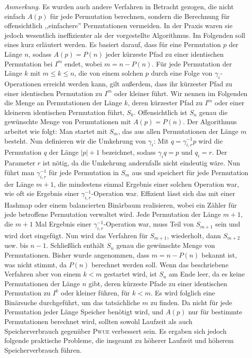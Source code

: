 \documentclass[a4paper, 11pt, ngerman]{article}
\begin{document}
\noindent \emph{Anmerkung.} Es wurden auch andere Verfahren in Betracht gezogen, die nicht einfach $A(p)$ für jede Permutation berechnen, sondern die Berechnung für offensichtlich ,,einfachere'' Permutationen vermeiden. In der Praxis waren sie jedoch wesentlich ineffizienter als der vorgestellte Algorithmus. Im Folgenden soll eines kurz erläutert werden. Es basiert darauf, dass für eine Permutation $p$ der Länge $n$, sodass $A(p) = P(n)$ jeder kürzeste Pfad zu einer identischen Permutation bei $I^{m}$ endet, wobei $m = n - P(n)$. Für jede Permutation der Länge $k$ mit $m \le k \le n$, die von einem solchen $p$ durch eine Folge von $\gamma_i$-Operationen erreicht werden kann, gilt außerdem, dass ihr kürzester Pfad zu einer identischen Permutation zu $I^m$ oder kleiner führt. Wir nennen im Folgenden die Menge an Permutationen der Länge $k$, deren kürzester Pfad zu $I^m$ oder einer kleineren identischen Permutation führt, $S_k$. Offensichtlich ist $S_n$ genau die gewünschte Menge von Permutationen mit $A(p) = P(n)$. Der Algorithmus arbeitet wie folgt: Man startet mit $S_m$, das aus allen Permutationen der Länge $m$ besteht. Nun definieren wir die Umkehrung von $\gamma_i$: Mit $q = \gamma_{i, r}^{-1} p$ wird die Permutation $q$ der Länge $|p| + 1$ bezeichnet, sodass $\gamma_i q = p$ und $q_i = r$. Der Parameter $r$ ist nötig, da die Umkehrung andernfalls nicht eindeutig wäre. Nun führt man $\gamma_{i, r}^{-1}$ für jede Permutation in $S_m$ aus und speichert für jede Permutation der Länge $m + 1$, die mindestens einmal Ergebnis einer solchen Operation war, wie oft sie Ergebnis einer $\gamma_{i, r}^{-1}$-Operation war. Effizient lässt sich das mit einer Hashmap oder einem balancierten Binärbaum realisieren, wobei ein Zähler für jede betroffene Permutation verwaltet wird. Jede Permutation der Länge $m+ 1$, die $m + 1$ Mal Ergebnis einer $\gamma_{i, r}^{-1}$-Operation war, muss Teil von $S_{m + 1}$ sein und wird dort eingefügt. Nun wird das Verfahren für $S_{m+ 1}$, wiederholt, dann $S_{m + 2}$ usw. bis $n - 1$. Schließlich enthält $S_n$ genau die gewünschte Menge von Permutationen. Bisher wurde angenommen, dass $m = n - P(n)$ bekannt ist, was nicht stimmt, da $P(n)$ berechnet werden soll. Wenn das beschriebene Verfahren aber von einem $k < m$ gestartet wird, ist $S_n$ am Ende leer, da es keine Permutationen der Länge $n$ gibt, deren kürzeste Pfade zu einer identischen Permutation zu $I^k$ oder kleiner führen, für $k < m$. Es wird folglich eine Binärsuche durchgeführt, um das tatsächliche $m$ zu finden. Da nicht für jede Permutation jeder Länge Speicher benötigt wird, und $A(p)$ nur für bestimmte Permutationen berechnet wird, sollten sowohl Laufzeit als auch Speicherverbrauch gegenüber \textsc{Pwue} verbessert sein. Es ergaben sich jedoch folgende praktische Probleme, die insgeamt zu höherer Laufzeit und höherem Speicherverbrauch führen.
\end{document}
